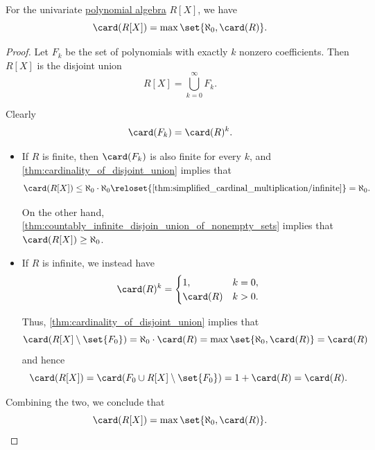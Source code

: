 \begin{proposition}\label{thm:univariate_polynomial_algebra_cardinality}
  For the univariate \hyperref[def:polynomial_algebra]{polynomial algebra} \( R[X] \), we have
  \begin{equation*}
    \card(R[X]) = \max\set{ \aleph_0, \card(R) }.
  \end{equation*}
\end{proposition}
\begin{proof}
  Let \( F_k \) be the set of polynomials with exactly \( k \) nonzero coefficients. Then \( R[X] \) is the disjoint union
  \begin{equation*}
    R[X] = \bigcup_{k=0}^\infty F_k.
  \end{equation*}

  Clearly
  \begin{equation*}
    \card(F_k) = \card(R)^k.
  \end{equation*}

  \begin{itemize}
    \item If \( R \) is finite, then \( \card(F_k) \) is also finite for every \( k \), and \cref{thm:cardinality_of_disjoint_union} implies that
    \begin{equation*}
      \card(R[X])
      \leq
      \aleph_0 \cdot \aleph_0
      \reloset {\ref{thm:simplified_cardinal_multiplication/infinite}} =
      \aleph_0.
    \end{equation*}

    On the other hand, \cref{thm:countably_infinite_disjoin_union_of_nonempty_sets} implies that \( \card(R[X]) \geq \aleph_0 \).

    \item If \( R \) is infinite, we instead have
    \begin{equation*}
      \card(R)^k = \begin{cases}
        1,       &k = 0, \\
        \card(R) &k > 0.
      \end{cases}
    \end{equation*}

    Thus, \cref{thm:cardinality_of_disjoint_union} implies that
    \begin{equation*}
      \card(R[X] \setminus \set{ F_0 }) = \aleph_0 \cdot \card(R) = \max\set{ \aleph_0, \card(R) } = \card(R)
    \end{equation*}
    and hence
    \begin{equation*}
      \card(R[X]) = \card(F_0 \cup R[X] \setminus \set{ F_0 }) = 1 + \card(R) = \card(R).
    \end{equation*}
  \end{itemize}

  Combining the two, we conclude that
  \begin{equation*}
    \card(R[X]) = \max\set{ \aleph_0, \card(R) }.
  \end{equation*}
\end{proof}

